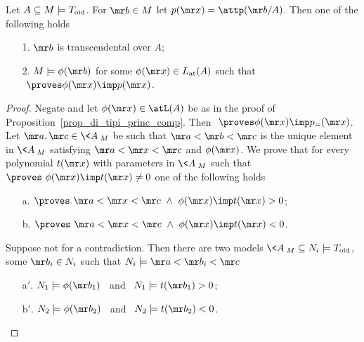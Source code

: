 \begin{proposition}\label{prop_di_tipi princ_comp}
  Let $A\subseteq M\models T_{\rm oid}$.
  For ${\mr b}\in M$ let $p({\mr x})=\attp({\mr b}/A)$.
  Then one of the following holds 
  \begin{itemize}
  \item[1.] ${\mr b}$ is transcendental over $A$;
  \item[2.] $M\models\phi({\mr b})$ for some $\phi({\mr x})\in L_{\rm at}(A)$ such that $\ \proves\phi({\mr x})\imp p({\mr x})$.
  \end{itemize}
\end{proposition}

\begin{proof}
  Negate  and let $\phi({\mr x})\in\atL(A)$ be as in the proof of Proposition~\ref{prop_di_tipi_princ_comp}.
  Then $\ \proves\phi({\mr x})\imp p_{=}({\mr x})$.
  Let ${\mr a},{\mr c}\in\<A\>_M$ be such that ${\mr a}<{\mr b}<{\mr c}$ is the unique element in $\<A\>_M$ satisfying ${\mr a}<{\mr x}<{\mr c}$ and $\phi({\mr x})$.
  We prove that for every polynomial $t({\mr x})$ with parameters in $\<A\>_M$ such that $\proves\ \phi({\mr x})\imp t({\mr x})\neq0$ one of the following holds
  \begin{itemize}
  \item[a.] $\proves\   {\mr a}<{\mr x}<{\mr c}\ \wedge\ \phi({\mr x})\imp t({\mr x})>0$;
  \item[b.] $\proves\   {\mr a}<{\mr x}<{\mr c}\ \wedge\ \phi({\mr x})\imp t({\mr x})<0$.
  \end{itemize}
  
  Suppose not for a contradiction. 
  Then there are two models $\<A\>_M\subseteq N_i\models T_{\rm oid}$, some ${\mr b_i}\in N_i$ such that $N_i\models{\mr a}<{\mr b_i}<{\mr c}$
  \begin{itemize}
  \item[a$'$.] $N_1\models \phi({\mr b_1})$ \ and \ $N_1\models t({\mr b_1}) > 0$;
  \item[b$'$.] $N_2\models \phi({\mr b_2})$ \ and \ $N_2\models t({\mr b_2}) < 0$.
  \end{itemize}
\end{proof}